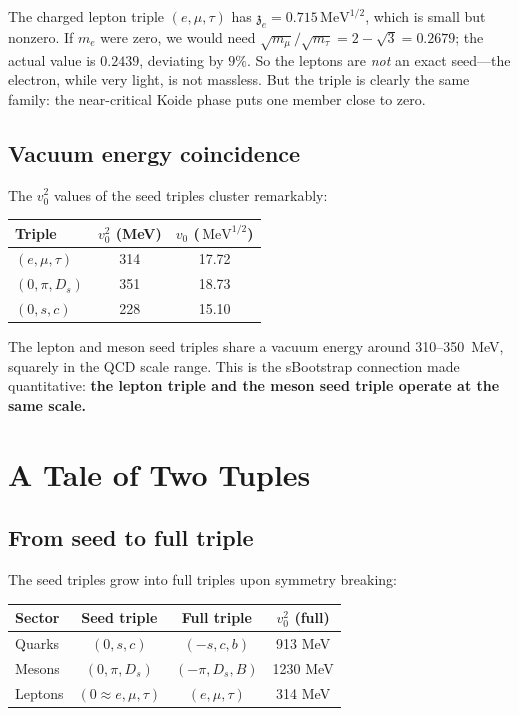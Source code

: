 \documentclass[12pt,a4paper]{article}
\newcommand{\MeV}{\,\text{MeV}}
\newcommand{\zch}{\mathfrak{z}}
\begin{document}
The charged lepton triple $(e, \mu, \tau)$ has $\zch_e = 0.715\MeV^{1/2}$, 
which is small but nonzero. If $m_e$ were zero, we would need 
$\sqrt{m_\mu}/\sqrt{m_\tau} = 2 - \sqrt{3} = 0.2679$; the actual value 
is $0.2439$, deviating by $9\%$. So the leptons are \emph{not} an 
exact seed---the electron, while very light, is not massless. But the 
triple is clearly the same family: the near-critical Koide phase puts 
one member close to zero.

\subsection{Vacuum energy coincidence}

The $v_0^2$ values of the seed triples cluster remarkably:

\begin{center}
\begin{tabular}{lcc}
\toprule
Triple & $v_0^2$ (MeV) & $v_0$ ($\MeV^{1/2}$) \\
\midrule
$(e, \mu, \tau)$ & 314 & 17.72 \\
$(0, \pi, D_s)$ & 351 & 18.73 \\
$(0, s, c)$ & 228 & 15.10 \\
\bottomrule
\end{tabular}
\end{center}

The lepton and meson seed triples share a vacuum energy around 
310--350~MeV, squarely in the QCD scale range. This is the 
sBootstrap connection made quantitative: \textbf{the lepton triple 
and the meson seed triple operate at the same scale.}

\section{A Tale of Two Tuples}
\label{sec:two_tuples}

\subsection{From seed to full triple}

The seed triples grow into full triples upon symmetry breaking:

\begin{center}
\begin{tabular}{lccc}
\toprule
Sector & Seed triple & Full triple & $v_0^2$ (full) \\
\midrule
Quarks & $(0, s, c)$ & $(-s, c, b)$ & 913 MeV \\
Mesons & $(0, \pi, D_s)$ & $(-\pi, D_s, B)$ & 1230 MeV \\
Leptons & $(0 \approx e, \mu, \tau)$ & $(e, \mu, \tau)$ & 314 MeV \\
\bottomrule
\end{tabular}
\end{center}
\end{document}
